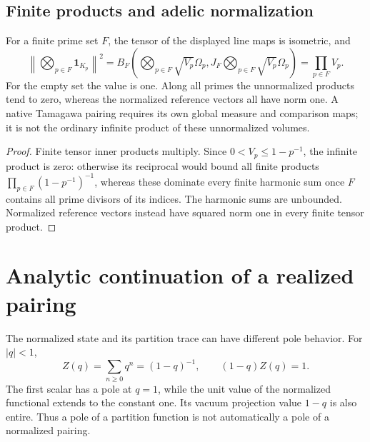 \subsection{Finite products and adelic normalization}
\label{v4-arith:kp:spherical-calc:global}

\begin{proposition}
\label{v4-arith:kp:prop:global-spherical-match}
For a finite prime set \(F\), the tensor of the displayed line maps
is isometric, and
\begin{equation}
 \left\|\bigotimes_{p\in F}\mathbf1_{K_p}\right\|^2
 =B_F\left(\bigotimes_{p\in F}\sqrt{V_p}\Omega_p,
           J_F\bigotimes_{p\in F}\sqrt{V_p}\Omega_p\right)
 =\prod_{p\in F}V_p.
 \label{v4-arith:kp:eq:global-spherical-match}
\end{equation}
For the empty set the value is one. Along all primes the unnormalized
products tend to zero, whereas the normalized reference vectors all
have norm one. A native Tamagawa pairing requires its own global
measure and comparison maps; it is not the ordinary infinite product
of these unnormalized volumes.
\end{proposition}
\begin{proof}
Finite tensor inner products multiply. Since
\(0<V_p\le1-p^{-1}\), the infinite product is zero: otherwise its
reciprocal would bound all finite products
\(\prod_{p\in F}(1-p^{-1})^{-1}\), whereas these dominate every finite
harmonic sum once \(F\) contains all prime divisors of its indices.
The harmonic sums are unbounded. Normalized reference vectors instead
have squared norm one in every finite tensor product.
\end{proof}

\section{Analytic continuation of a realized pairing}
\label{v4-arith:kp:analytic-cont}
\label{v4-arith:kp:analytic-cont:poles}

The normalized state and its partition trace can have different pole
behavior. For \(|q|<1\),
\[
 Z(q)=\sum_{n\ge0}q^n=(1-q)^{-1},\qquad
 (1-q)Z(q)=1.
\]
The first scalar has a pole at \(q=1\), while the unit value of the
normalized functional extends to the constant one. Its vacuum projection
value \(1-q\) is also entire. Thus a pole of a partition function is
not automatically a pole of a normalized pairing.

